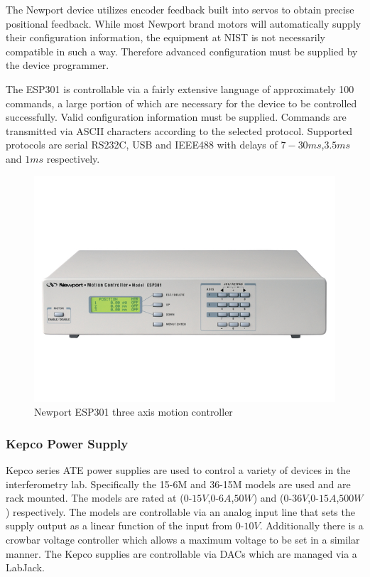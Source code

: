 The Newport device utilizes encoder feedback built into servos to obtain precise positional feedback. While most Newport brand motors will automatically supply their configuration information, the equipment at NIST is not necessarily compatible in such a way. Therefore advanced configuration must be supplied by the device programmer. 

The ESP301 is controllable via a fairly extensive language of approximately 100 commands, a large portion of which are necessary for the device to be controlled successfully. Valid configuration information must be supplied. Commands are transmitted via ASCII characters according to the selected protocol. Supported protocols are serial RS232C, USB and IEEE488 with delays of $7-30ms$,$3.5ms$ and $1ms$ respectively.

\begin{figure}[ht!]
\centering
\includegraphics[scale=0.5]{Figures/esp301.jpg}
\caption{Newport ESP301 three axis motion controller}
\label{fig:esp301}
\end{figure}
\subsubsection{Kepco Power Supply}
Kepco series ATE power supplies are used to control a variety of devices in the interferometry lab. Specifically the 15-6M and 36-15M models are used and are rack mounted. The models are rated at ($0$-$15V$,$0$-$6A$,$50W$) and ($0$-$36V$,$0$-$15A$,$500W$) respectively.\cite{kepco} The models are controllable via an analog input line that sets the supply output as a linear function of the input from $0$-$10V$. Additionally there is a crowbar voltage controller which allows a maximum voltage to be set in a similar manner. The Kepco supplies are controllable via DACs which are managed via a LabJack. 
